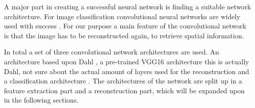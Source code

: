 {\color{red} 

A major part in creating a successful neural network is finding a suitable network architecture. For image classification convolutional neural networks are widely used with success \cite{Krizhevsky,Szegedy,Simonyan}. For our purpose a main feature of the convolutional network is that the image has to be reconstructed again, to retrieve spatial information.


In total a set of three convolutional network architectures are used. An architecture based upon Dahl \cite{Dahl}, a pre-trained VGG16 \cite{Simonyan} architecture {\color{red} this is actually Dahl,  not sure about the actual amount of layers used for the reconstruction} and a classification architecture \cite{Zhang}. The architectures of the network are split up in a feature extraction part and a reconstruction part, which will be expanded upon in the following sections.}\\ 
\\%

